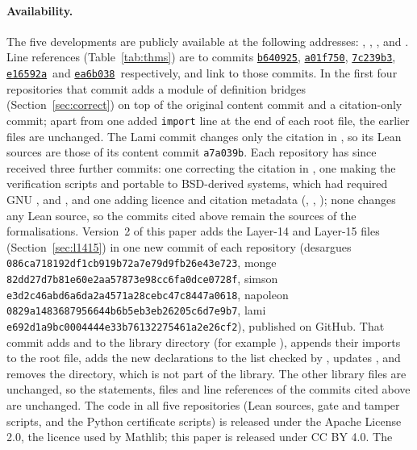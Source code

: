 \documentclass[11pt]{article}
\theoremstyle{definition}
\theoremstyle{remark}
\newcommand{\lean}[1]{\texttt{#1}}
\newcommand{\commitdesargues}{\href{\repo{desargues}/tree/b6409255c844abb6e1cad80b23f8182fc3934116}{\texttt{b640925}}}
\newcommand{\commitmonge}{\href{\repo{monge}/tree/a01f7504d12fd492dd30c66f880905b21cca3895}{\texttt{a01f750}}}
\newcommand{\commitsimson}{\href{\repo{simson}/tree/7c239b31600575db241b45dda4930cf9486e7d17}{\texttt{7c239b3}}}
\newcommand{\commitnapoleon}{\href{\repo{napoleon}/tree/e16592ae04be8e5516a2caef52418c6c60df5165}{\texttt{e16592a}}}
\newcommand{\commitlami}{\href{\repo{lami}/tree/ea6b038b1a3eebd9b02465650901f4b5d4ddaf19}{\texttt{ea6b038}}}
\newcommand{\repo}[1]{https://github.com/jpbald93/#1}
\begin{document}
\paragraph{Availability.}
The five developments are publicly available at the following addresses:
,
,
,
 and
.
Line references (Table~\ref{tab:thms}) are to commits \commitdesargues, \commitmonge,
\commitsimson, \commitnapoleon\ and \commitlami\ respectively, and link to those commits. In the
first four repositories that commit adds a module  of definition bridges
(Section~\ref{sec:correct}) on top of the original content commit and a citation-only commit;
apart from one added \lean{import} line at the end of each root file, the earlier files are
unchanged. The Lami commit changes only the citation in , so its Lean sources are
those of its content commit \texttt{a7a039b}. Each repository has since received three further
commits: one correcting the citation in , one making the verification scripts
 and  portable to BSD-derived systems, which had required GNU
,  and , and one adding licence and citation metadata
(, , ); none changes any Lean source, so the commits
cited above remain the sources of the formalisations. Version~2 of this paper adds the Layer-14 and
Layer-15 files (Section~\ref{sec:l1415}) in one new commit of each repository (desargues
\texttt{086ca718192df1cb919b72a7e79d9fb26e43e723}, monge \texttt{82dd27d7b81e60e2aa57873e98cc6fa0dce0728f}, simson \texttt{e3d2c46abd6a6da2a4571a28cebc47c8447a0618}, napoleon \texttt{0829a1483687956644b6b5eb3eb26205c6d7e9b7},
lami \texttt{e692d1a9bc0004444e33b76132275461a2e26cf2}), published on GitHub. That commit adds  and  to the
library directory (for example ), appends their imports to the root
file, adds the new declarations to the list checked by , updates , and
removes the  directory, which is not part of the library. The other library files are
unchanged, so the statements, files and line references of the commits cited above are unchanged. The code in all five repositories (Lean
sources, gate and tamper scripts, and the Python certificate scripts) is released under the Apache
License 2.0, the licence used by Mathlib; this paper is released under CC BY 4.0. The
\end{document}

